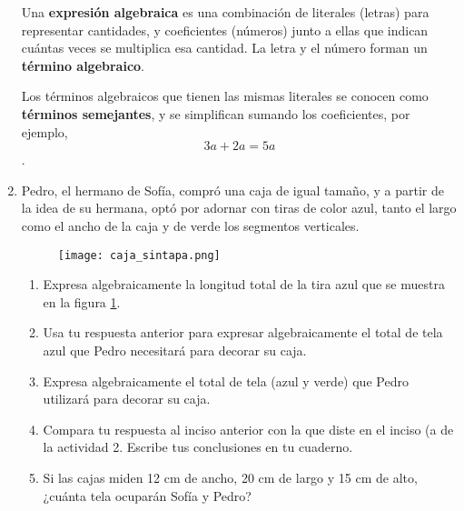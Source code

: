 \begin{enumerate}
          \begin{boxH}
              Una \textbf{expresión algebraica} es una combinación de literales (letras) para representar
              cantidades, y coeficientes (números) junto a ellas que indican cuántas veces se
              multiplica esa cantidad. La letra y el número forman un \textbf{término algebraico}.
          \end{boxH}

          \begin{boxH}
              Los términos algebraicos que tienen las mismas literales se conocen como \textbf{términos semejantes},
              y se simplifican sumando los coeficientes, por ejemplo, \[ 3a + 2a = 5a \].
          \end{boxH}

    \item Pedro, el hermano de Sofía, compró una caja de igual tamaño, y a partir de la idea de
          su hermana, optó por adornar con tiras de color azul, tanto el largo como el ancho de
          la caja y de verde los segmentos verticales.

          \begin{minipage}[t]{0.3\textwidth}
              \begin{figure}[H]
                  \centering
                  \texttt{[image: caja\_sintapa.png]}
                  \label{fig:caja_sintapa}
              \end{figure}
          \end{minipage}\hfill
          \begin{minipage}[t]{0.7\textwidth}
              \begin{enumerate}
                  \item Expresa algebraicamente la longitud total de la tira azul que se muestra en la figura \ref{fig:caja_sintapa}.
                  \item Usa tu respuesta anterior para expresar algebraicamente el total de tela azul que
                        Pedro necesitará para decorar su caja.
                  \item Expresa algebraicamente el total de tela (azul y verde) que Pedro utilizará para decorar su caja.
                  \item Compara tu respuesta al inciso anterior con la que diste en el inciso (a de la actividad 2.
                        Escribe tus conclusiones en tu cuaderno.
                  \item Si las cajas miden 12 cm de ancho, 20 cm de largo y 15 cm de alto, ¿cuánta tela ocuparán Sofía y Pedro?
              \end{enumerate}
          \end{minipage}



\end{enumerate}
